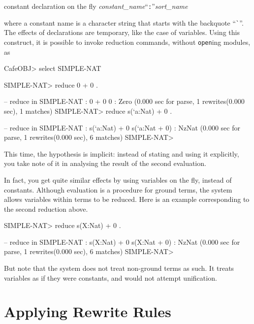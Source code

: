 \documentclass[a4paper]{memoir}
\begin{document}
\begin{bsyntax} constant declaration on the fly \Hline
\textit{constant\_name}``\texttt{:}''\textit{sort\_name}
\end{bsyntax}

where a constant name is a character string that starts with
the backquote ``\verb|`|''.
The effects of declarations are temporary, like the case of variables.
Using this construct, it is possible to invoke reduction commands,
without \verb|open|ing modules, as
\begin{vvtm}
\begin{ccode}

  CafeOBJ> select SIMPLE-NAT

  SIMPLE-NAT> reduce 0 + 0 .

  -- reduce in SIMPLE-NAT : 0 + 0
  0 : Zero
  (0.000 sec for parse, 1 rewrites(0.000 sec), 1 matches)
  SIMPLE-NAT> reduce s(`a:Nat) + 0 .

  -- reduce in SIMPLE-NAT : s(`a:Nat) + 0
  s(`a:Nat + 0) : NzNat
  (0.000 sec for parse, 1 rewrites(0.000 sec), 6 matches)
  SIMPLE-NAT> 
\end{ccode}
\end{vvtm}
This time, the hypothesis is implicit: instead of stating and using
it explicitly, you take note of it in analysing the result of the
second evaluation.

\begin{warning}
  In fact, you get quite similar effects by using variables on the
  fly, instead of constants. Although evaluation is a procedure
  for ground terms, the system allows variables within terms to
  be reduced. Here is an example corresponding to the second reduction
  above.
  \begin{vvtm}
\begin{ccode}
    SIMPLE-NAT> reduce s(X:Nat) + 0 .

    -- reduce in SIMPLE-NAT : s(X:Nat) + 0
    s(X:Nat + 0) : NzNat
    (0.000 sec for parse, 1 rewrites(0.000 sec), 6 matches)
    SIMPLE-NAT> 
  \end{ccode}
\end{vvtm}
  But note that the system does not treat non-ground terms as such.
  It treats variables as if they were constants, and would not attempt
  unification.
\end{warning}

\section{Applying Rewrite Rules}\label{sec:p2-applying-rules}
\end{document}
